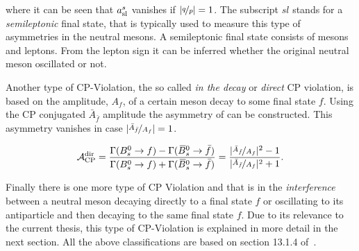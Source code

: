 \noindent where it can be seen that $a_{\rm sl}^{s}$ vanishes if $|\nicefrac{q}{p}|= 1$. The subscript $sl$ stands for a {\it semileptonic}
final state, that is typically used to measure this type of asymmetries in the neutral mesons. A semileptonic final state
consists of mesons and leptons. From the lepton sign it can be inferred whether the original neutral meson oscillated or not.

Another type of CP-Violation, the so called {\it in the decay} or {\it direct} CP violation, is based on the
amplitude, $A_f$, of a certain meson decay to some final state $f$.
Using the CP conjugated $\bar{A}_{\bar{f}}$ amplitude the asymmetry of  can be constructed.
This asymmetry vanishes in case $|\nicefrac{\bar{A}_{\bar{f}}}{A_f}| = 1$.

\begin{equation}
  \centering
  \Acp{\text{dir}} = \frac{\Gamma(\Bs \rightarrow f) - \Gamma(\Bsb \rightarrow \bar{f})} {\Gamma(\Bs \rightarrow f) + \Gamma(\Bsb \rightarrow \bar{f})}
                   = \frac{ |\nicefrac{\bar{A}_{\bar{f}}}{A_f}|^2 - 1}{|\nicefrac{\bar{A}_{\bar{f}}}{A_f}|^2 + 1}.
\label{cpv_decay}
\end{equation}

Finally there is one more type of CP Violation and that is in the {\it interference} between
a neutral meson decaying directly to a final state $f$ or oscillating to its antiparticle and then decaying
to the same final state $f$. Due to its relevance to the current thesis, this type of CP-Violation is explained
in more detail in the next section. All the above classifications are based on section 13.1.4 of~\cite{PDG}.
